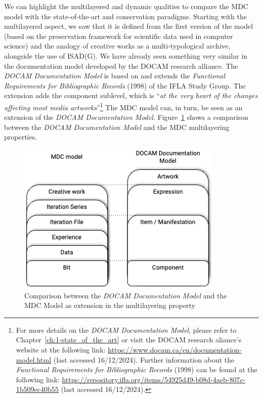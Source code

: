 We can highlight the multilayered and dynamic qualities to compare the MDC model with the state-of-the-art and conservation paradigms. Starting with the multilayered aspect, we saw that it is defined from the first version of the model (based on the preservation framework for scientific data used in computer science) and the analogy of creative works as a multi-typological archive, alongside the use of ISAD(G). We have already seen something very similar in the documentation model developed by the DOCAM research alliance. The \textit{DOCAM Documentation Model} is based on and extends the \textit{Functional Requirements for Bibliographic Records} (1998) \cite{plassard1998functional} of the IFLA Study Group. The extension adds the component sublevel, which is ``\textit{at the very heart of the changes affecting most media artworks}''\footnote{For more details on the \textit{DOCAM Documentation Model}, please refer to Chapter~\ref{ch:1-state_of_the_art} or visit the DOCAM research aliance's website at the following link: \url{https://www.docam.ca/en/documentation-model.html} (last accessed 16/12/2024). Further information about the \textit{Functional Requirements for Bibliographic Records} (1998) can be found at the following link: \url{https://repository.ifla.org/items/54925d49-b08d-4aeb-807c-1b509ec40b55} (last accessed 16/12/2024).} The MDC model can, in turn, be seen as an extension of the \textit{DOCAM Documentation Model}. Figure~\ref{fig:c3-mdc-docam} shows a comparison between the \textit{DOCAM Documentation Model} and the MDC multilayering properties.
\begin{figure}[!h]
    \centering
    \includegraphics[width=0.5\linewidth]{chapters/3-mdc_model-reactivation_workflow-instruction_template/image/graph03-mdc-docam.png}
    \caption{Comparison between the \textit{DOCAM Documentation Model} and the MDC Model as extension in the multilayering property}
    \label{fig:c3-mdc-docam}
\end{figure}
